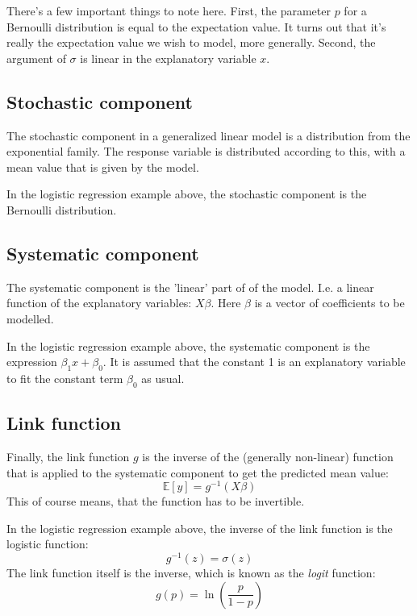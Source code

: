 \documentclass[12pt, a4paper]{article}
\numberwithin{equation}{section}
\begin{document}
There's a few important things to note here. First, the parameter $p$ for a Bernoulli distribution is equal to the expectation value. It turns out that it's really the expectation value we wish to model, more generally. Second, the argument of $\sigma$ is linear in the explanatory variable $x$.

\subsection{Stochastic component}
The stochastic component in a generalized linear model is a distribution from the exponential family. The response variable is distributed according to this, with a mean value that is given by the model.

In the logistic regression example above, the stochastic component is the Bernoulli distribution.

\subsection{Systematic component}
The systematic component is the 'linear' part of of the model. I.e. a linear function of the explanatory variables: $X\beta$. Here $\beta$ is a vector of coefficients to be modelled.

In the logistic regression example above, the systematic component is the expression $\beta_1 x+\beta_0$. It is assumed that the constant 1 is an explanatory variable to fit the constant term $\beta_0$ as usual.

\subsection{Link function}
Finally, the link function $g$ is the inverse of the (generally non-linear) function that is applied to the systematic component to get the predicted mean value:
\begin{equation}
\mathbb{E}[y]=g^{-1}(X\beta)
\end{equation}
This of course means, that the function has to be invertible.

In the logistic regression example above, the inverse of the link function is the logistic function:
\begin{equation}
g^{-1}(z)=\sigma(z)
\end{equation}
The link function itself is the inverse, which is known as the \textit{logit} function:
\begin{equation}
g(p)=\ln\left(\frac{p}{1-p}\right)
\end{equation}
\end{document}
